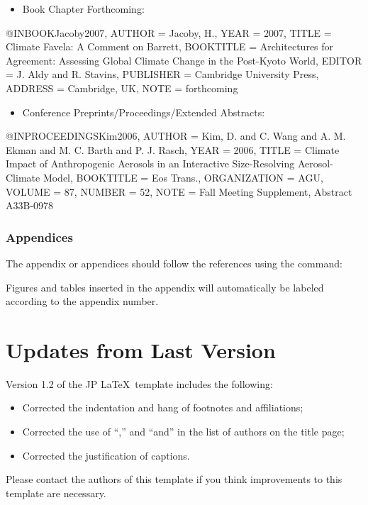\documentclass[12pt,fleqn]{article}
\let\oldverbatim\verbatim
\let\oldendverbatim\endverbatim
\renewenvironment{verbatim}{\endgraf\footnotesize\singlespace\oldverbatim}{\oldendverbatim\endsinglespace}
\begin{document}
\begin{itemize}
\item Book Chapter Forthcoming:
\end{itemize}
\begin{verbatim}
@INBOOK{Jacoby2007,
  AUTHOR = {Jacoby, H.},
  YEAR = {2007},
  TITLE = {Climate Favela: A Comment on Barrett},
  BOOKTITLE = {Architectures for Agreement: Assessing Global Climate Change in
  the Post-Kyoto World},
  EDITOR = {J. Aldy and R. Stavins},
  PUBLISHER = {Cambridge University Press},
  ADDRESS = {Cambridge, UK},
  NOTE = {forthcoming}}
\end{verbatim}

\begin{itemize}
\item Conference Preprints/Proceedings/Extended Abstracts:
\end{itemize}
\begin{verbatim}
@INPROCEEDINGS{Kim2006,
  AUTHOR = {Kim, D. and C. Wang and A. M. Ekman and M. C. Barth and P. J. Rasch},
  YEAR = {2006},
  TITLE = {Climate Impact of Anthropogenic Aerosols in an Interactive
  Size-Resolving Aerosol-Climate Model},
  BOOKTITLE = {Eos Trans.},
  ORGANIZATION = {AGU},
  VOLUME = {87},
  NUMBER = {52},
  NOTE = {{F}all Meeting Supplement, Abstract A33B-0978}}
\end{verbatim}

\subsubsection{Appendices}

The appendix or appendices should follow the references using the command:
\begin{verbatim}
\appendix                             % to start the appendix portion
\appsection{}                         % if the appendix does not have a title
  % if the appendix has a title
\end{verbatim}

Figures and tables inserted in the appendix will automatically be labeled 
according to the appendix number.

\section{Updates from Last Version}

Version 1.2 of the JP \LaTeX\, template includes the following:
\begin{itemize}
  \item Corrected the indentation and hang of footnotes and affiliations;
  \item Corrected the use of ``,'' and ``and'' in the list of authors on the 
  title page;
  \item Corrected the justification of captions.
\end{itemize}
Please contact the authors of this template if you think improvements to this 
template are necessary.
\end{document}
